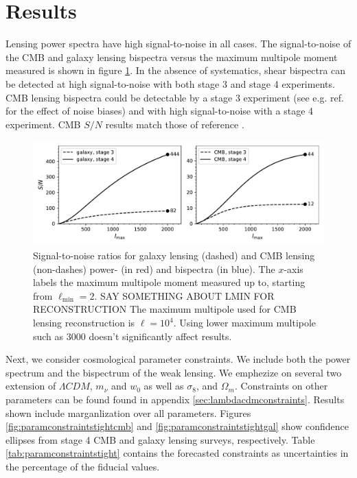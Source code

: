 \documentclass[11pt]{article} %
\begin{document}
\section{Results}\label{sec:results}
Lensing power spectra have high signal-to-noise in all cases. 
The signal-to-noise of the CMB and galaxy lensing bispectra versus the maximum multipole moment measured is shown in figure \ref{fig:snrplots}. In the absence of systematics, shear bispectra can be detected at high signal-to-noise with both stage 3 and stage 4 experiments. CMB lensing bispectra could be  detectable by a stage 3 experiment (see e.g. ref.~\cite{} for the effect of noise biases) and with high signal-to-noise with a stage 4 experiment. CMB $S/N$ results match those of reference \cite{Namikawa_2016}.
\begin{figure}[h!]
    \includegraphics[width=\textwidth]{figures/snrplots.pdf}
    \caption{Signal-to-noise ratios for galaxy lensing (dashed) and CMB lensing (non-dashes) power- (in red) and bispectra (in blue). The $x$-axis labels the maximum multipole moment measured up to, starting from $\ell_{\min}=2$.  SAY SOMETHING ABOUT LMIN FOR RECONSTRUCTION The maximum multipole used for CMB lensing reconstruction is $\ell = 10^4$. Using lower maximum multipole such as 3000 doesn't significantly affect results.}
    \label{fig:snrplots}
\end{figure}

Next, we consider cosmological parameter constraints. We include both the power spectrum and the bispectrum of the weak lensing. We emphezize on several two extension of $\Lambda CDM$, $m_\nu$ and $w_0$ as well as $\sigma_8$, and $\Omega_m$. Constraints on other parameters can be found found in appendix \ref{sec:lambdacdmconstraints}. Results shown include marganlization over all parameters. Figures \ref{fig:paramconstraintstightcmb} and \ref{fig:paramconstraintstightgal} show confidence ellipses from stage 4 CMB and galaxy lensing surveys, respectively. Table \ref{tab:paramconstraintstight} contains the forecasted constraints as uncertainties in the percentage of the fiducial values. 
\end{document}
